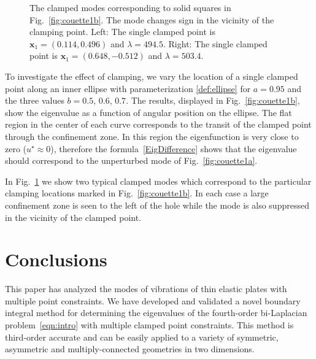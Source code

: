 \documentclass[times]{article}
\newcommand{\xx}{\mathbf{x}}
\begin{document}
\begin{figure}[htbp]
\centering
{}\hspace{0.5in}
\parbox{0.75\textwidth}{\caption{The clamped modes corresponding to
solid squares in Fig.~\ref{fig:couette1b}. The mode changes sign in the
vicinity of the clamping point. Left: The single clamped point is $\xx_1
= (0.114, 0.496)$ and $\lambda = 494.5$. Right: The single clamped point
is $\xx_1 = (0.648, -0.512)$ and $\lambda = 503.4$.}
\label{fig:couetteModes} }
\end{figure}

To investigate the effect of clamping, we vary the location of a single
clamped point along an inner ellipse with parameterization
\eqref{def:ellipse} for $a=0.95$ and the three values $b= 0.5$, $0.6$,
$0.7$. The results, displayed in Fig.~\ref{fig:couette1b}, show the
eigenvalue as a function of angular position on the ellipse. The flat
region in the center of each curve corresponds to the transit of the
clamped point through the confinement zone. In this region the
eigenfunction is very close to zero ($u^{\star}\approx 0$), therefore
the formula~\eqref{EigDifference} shows that the eigenvalue should
correspond to the unperturbed mode of Fig.~\ref{fig:couette1a}.
%

In Fig.~\ref{fig:couetteModes} we show two typical clamped modes which correspond to the particular clamping locations marked in Fig.~\ref{fig:couette1b}. In each case a large confinement zone is seen to the left of the hole while the mode is also suppressed in the vicinity of the clamped point.

\section{Conclusions}\label{sec:conclusions}

This paper has analyzed the modes of vibrations of thin elastic plates
with multiple point constraints. We have developed and validated a novel
boundary integral method for determining the eigenvalues of the
fourth-order bi-Laplacian problem~\eqref{eqn:intro} with multiple
clamped point constraints. This method is third-order accurate and can
be easily applied to a variety of symmetric, asymmetric and
multiply-connected geometries in two dimensions.
\end{document}
